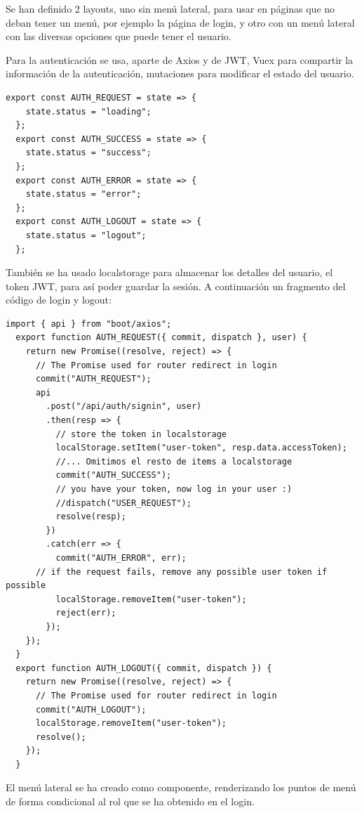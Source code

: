 \documentclass[11pt,spanish,listoffigures,listoftables]{tfgetsinf}
\begin{document}
Se han definido 2 layouts, uno sin menú lateral, para usar en páginas que no deban tener un menú, por ejemplo la página de login, y otro con un menú lateral con las diversas opciones que puede tener el usuario.

Para la autenticación se usa, aparte de Axios y de JWT, Vuex para compartir la información de la autenticación, mutaciones para modificar el estado del usuario. 
\begin{lstlisting}[style=ES6, caption={Estados Vuex autenticación}]
  export const AUTH_REQUEST = state => {
    state.status = "loading";
  };
  export const AUTH_SUCCESS = state => {
    state.status = "success";
  };
  export const AUTH_ERROR = state => {
    state.status = "error";
  };
  export const AUTH_LOGOUT = state => {
    state.status = "logout";
  };
\end{lstlisting}


También se ha usado localstorage para almacenar los detalles del usuario, el token JWT, para así poder guardar la sesión. A continuación un fragmento del código de login y logout:

\begin{lstlisting}[style=ES6, caption={Dispatch de una acción Vuex en el login}]
  import { api } from "boot/axios";
  export function AUTH_REQUEST({ commit, dispatch }, user) {
    return new Promise((resolve, reject) => {
      // The Promise used for router redirect in login
      commit("AUTH_REQUEST");
      api
        .post("/api/auth/signin", user)
        .then(resp => {
          // store the token in localstorage
          localStorage.setItem("user-token", resp.data.accessToken); 
          //... Omitimos el resto de items a localstorage
          commit("AUTH_SUCCESS");
          // you have your token, now log in your user :)
          //dispatch("USER_REQUEST");
          resolve(resp);
        })
        .catch(err => {
          commit("AUTH_ERROR", err);
      // if the request fails, remove any possible user token if possible
          localStorage.removeItem("user-token"); 
          reject(err);
        });
    });
  }  
  export function AUTH_LOGOUT({ commit, dispatch }) {
    return new Promise((resolve, reject) => {
      // The Promise used for router redirect in login
      commit("AUTH_LOGOUT");
      localStorage.removeItem("user-token");
      resolve();
    });
  }
\end{lstlisting}

El menú lateral se ha creado como componente, renderizando los puntos de menú de forma condicional al rol que se ha obtenido en el login.
\end{document}
